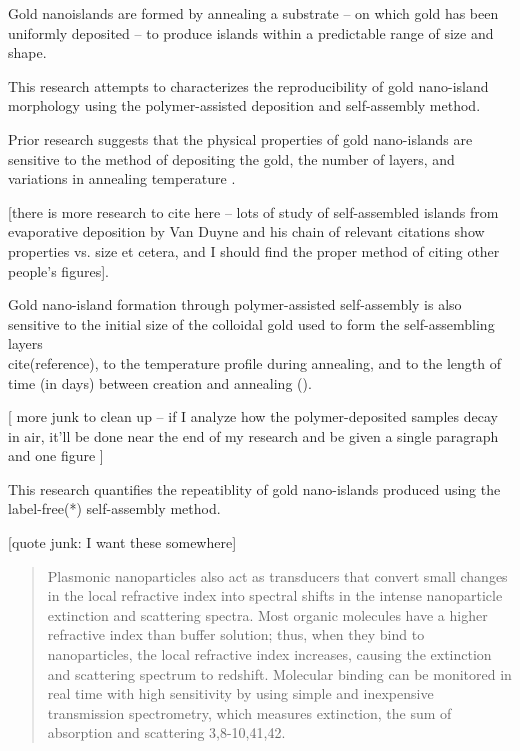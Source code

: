 \documentclass[12pt,oneside,english]{article}
\begin{document}
	Gold nanoislands  are formed by annealing a substrate -- on which gold has been uniformly deposited -- to produce islands within a predictable range of size and shape.
	
	This research attempts to characterizes the reproducibility of gold nano-island morphology using the polymer-assisted deposition and self-assembly method.
	
	Prior research suggests that the physical properties of gold nano-islands are sensitive to the method of depositing the gold, the number of layers, and variations in annealing temperature \cite{shon11}.

 [there is more research to cite here -- lots of study of self-assembled islands from evaporative deposition by Van Duyne and his chain of relevant citations show properties vs. size et cetera, and I should find the proper method of citing other people's figures].  

	Gold nano-island formation through polymer-assisted self-assembly is also sensitive to the initial size of the colloidal gold used to form the self-assembling layers \\cite(reference), to the temperature profile during annealing, and to the length of time (in days) between creation and annealing (\cite{joshi}).

	[ more junk to clean up -- if I analyze how the polymer-deposited samples decay in air, it'll be done near the end of my research and be given a single paragraph and one figure ]
	
	This research quantifies the repeatiblity of gold nano-islands produced using the label-free(*) self-assembly method.

	[quote junk: I want these somewhere]
	
	\begin{quote}
	Plasmonic nanoparticles also act as transducers that convert small changes in the local refractive index into spectral shifts in the intense nanoparticle extinction and scattering spectra. 
	Most organic molecules have a higher refractive index than buffer solution; thus, when they bind to nanoparticles, the local refractive index increases, causing the extinction and scattering spectrum to redshift. 
	Molecular binding can be monitored in real time with high sensitivity by using simple and inexpensive transmission spectrometry, which measures extinction, the sum of absorption and scattering 3,8-10,41,42. 
	\cite{nature2008}
	\end{quote}
\end{document}

